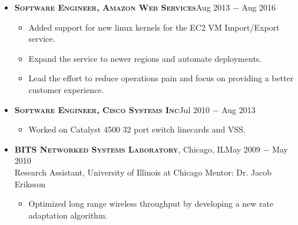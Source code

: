 \documentclass[10pt,oneside]{article}
\newcommand{\subheader}[1]{\textsc{\textbf{\large{#1}}}}
\begin{document}
{{\begin{itemize}
    \item	
      \subheader{Software Engineer, Amazon Web Services}\hfill Aug 2013 $-$ Aug 2016\\
      \vspace{-4 pt}
      \begin{itemize}
        \item Added support for new linux kernels for the EC2 VM Import/Export service.
        \item Expand the service to newer regions and automate deployments.
		\item Lead the effort to reduce operations pain and focus on providing a better customer experience.
      \end{itemize} 

    \item
      \subheader{Software Engineer, Cisco Systems Inc}\hfill Jul 2010 $-$ Aug 2013\\
      \vspace{-4 pt}
      \begin{itemize}
          \item Worked on Catalyst 4500\textsuperscript{\textregistered} 32 port switch linecards and VSS.
      \end{itemize}

    \item
      \subheader{BITS Networked Systems Laboratory}, Chicago, IL\hfill May 2009 $-$ May 2010\\
      Research Assistant, University of Illinois at Chicago 
      Mentor: Dr. Jacob Eriksson
      \vspace{-4 pt}
	    \begin{itemize}
        \item Optimized long range wireless throughput by developing a new rate adaptation algorithm.
      \end{itemize}


\end{itemize}}}
\end{document}
